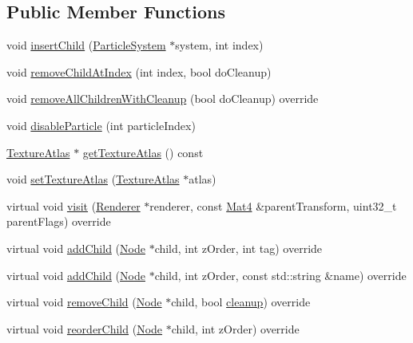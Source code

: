 \subsection*{Public Member Functions}
\begin{DoxyCompactItemize}
\item 
void \hyperlink{classParticleBatchNode_a1d1efda71101dc032ffee3e24ee1a61e}{insert\+Child} (\hyperlink{classParticleSystem}{Particle\+System} $\ast$system, int index)
\item 
void \hyperlink{classParticleBatchNode_a7f46acad56bfa65d5903121072f22a1a}{remove\+Child\+At\+Index} (int index, bool do\+Cleanup)
\item 
void \hyperlink{classParticleBatchNode_ac4875ff56dadd5f836d9b99a36201bb1}{remove\+All\+Children\+With\+Cleanup} (bool do\+Cleanup) override
\item 
void \hyperlink{classParticleBatchNode_a8041807df39f5cdfa35b5423bb5c4a17}{disable\+Particle} (int particle\+Index)
\item 
\hyperlink{classTextureAtlas}{Texture\+Atlas} $\ast$ \hyperlink{classParticleBatchNode_a815bf8adf7dc63a80730136e527bcf46}{get\+Texture\+Atlas} () const
\item 
void \hyperlink{classParticleBatchNode_a67fa60ccb7be07438228ea461682a483}{set\+Texture\+Atlas} (\hyperlink{classTextureAtlas}{Texture\+Atlas} $\ast$atlas)
\item 
virtual void \hyperlink{classParticleBatchNode_ad11baa30bf900df09491dd652d16b954}{visit} (\hyperlink{classRenderer}{Renderer} $\ast$renderer, const \hyperlink{classMat4}{Mat4} \&parent\+Transform, uint32\+\_\+t parent\+Flags) override
\item 
virtual void \hyperlink{classParticleBatchNode_ae64b2ef0a26f90c90b7afd090ea12825}{add\+Child} (\hyperlink{classNode}{Node} $\ast$child, int z\+Order, int tag) override
\item 
virtual void \hyperlink{classParticleBatchNode_a916997259e6b13d141d18e5a1d488943}{add\+Child} (\hyperlink{classNode}{Node} $\ast$child, int z\+Order, const std\+::string \&name) override
\item 
virtual void \hyperlink{classParticleBatchNode_a44ecab9f55fdf0196cb40fd39781bea6}{remove\+Child} (\hyperlink{classNode}{Node} $\ast$child, bool \hyperlink{classNode_aa2de84c6cdeec9cd647d236c30ee0567}{cleanup}) override
\item 
virtual void \hyperlink{classParticleBatchNode_a252befcd88cd095ab65809e94bb852ad}{reorder\+Child} (\hyperlink{classNode}{Node} $\ast$child, int z\+Order) override

\end{DoxyCompactItemize}
